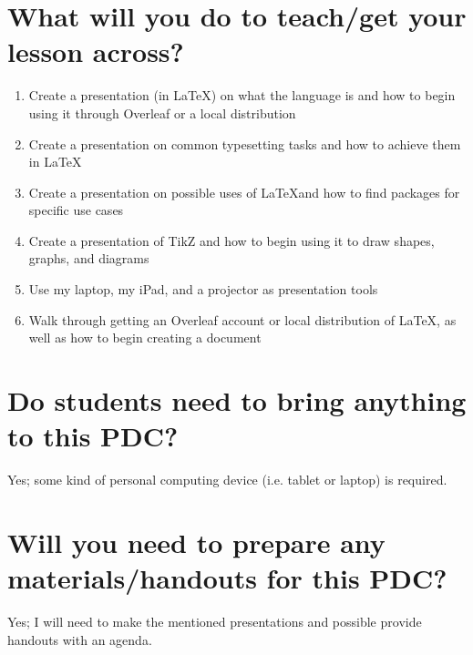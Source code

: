 \documentclass{article}
\begin{document}
\section[teaching-material]{What will you do to teach/get your lesson across?}
\begin{enumerate}
    \item Create a presentation (in \LaTeX) on what the language is and how to begin using it through Overleaf or a local distribution
    \item Create a presentation on common typesetting tasks and how to achieve them in \LaTeX
    \item Create a presentation on possible uses of \LaTeX and how to find packages for specific use cases
    \item Create a presentation of TikZ and how to begin using it to draw shapes, graphs, and diagrams
    \item Use my laptop, my iPad, and a projector as presentation tools
    \item Walk through getting an Overleaf account or local distribution of \LaTeX, as well as how to begin creating a document
\end{enumerate}

\section[requirements]{Do students need to bring anything to this PDC?}
Yes; some kind of personal computing device (i.e. tablet or laptop) is required.

\section[materials-handouts]{Will you need to prepare any materials/handouts for this PDC?}
Yes; I will need to make the mentioned presentations and possible provide handouts with an agenda.
\end{document}
